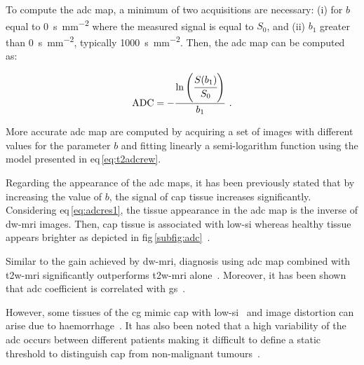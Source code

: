 To compute the \ac{adc} map, a minimum of two acquisitions are necessary: (i) for $b$ equal to \SI{0}{\second\per\milli\metre\squared} where the measured signal is equal to $S_0$, and (ii) $b_1$ greater than \SI{0}{\second\per\milli\metre\squared}, typically \SI{1000}{\second\per\milli\metre\squared}.
Then, the \ac{adc} map can be computed as:

\begin{equation}
	\text{ADC} = - \frac{\ln \left( \cfrac{S(b_1)}{S_0} \right) }{b_1} \ .
	\label{eq:adcres1}
\end{equation}

More accurate \ac{adc} map are computed by acquiring a set of images with different values for the parameter $b$ and fitting linearly a semi-logarithm function using the model presented in \acs{eq}\,\eqref{eq:t2adcrew}.

Regarding the appearance of the \ac{adc} maps, it has been previously stated that by increasing the value of $b$, the signal of \ac{cap} tissue increases significantly.
Considering \acs{eq}\,\eqref{eq:adcres1}, the tissue appearance in the \ac{adc} map is the inverse of \ac{dw}-\ac{mri} images.
Then, \ac{cap} tissue is associated with low-\ac{si} whereas healthy tissue appears brighter as depicted in \acs{fig}\,\ref{subfig:adc}~\cite{Barentsz2012}.

Similar to the gain achieved by \ac{dw}-\ac{mri}, diagnosis using \ac{adc} map combined with \ac{t2w}-\ac{mri} significantly outperforms \ac{t2w}-\ac{mri} alone~\cite{Doo2012,Choi2007}.
Moreover, it has been shown that \ac{adc} coefficient is correlated with \ac{gs}~\cite{Hambrock2011,Itou2011,Peng2013}.

However, some tissues of the \ac{cg} mimic \ac{cap} with low-\ac{si}~\cite{Kirkham2006} and image distortion can arise due to haemorrhage~\cite{Choi2007}.
It has also been noted that a high variability of the \ac{adc} occurs between different patients making it difficult to define a static threshold to distinguish \ac{cap} from non-malignant tumours~\cite{Choi2007}. 

